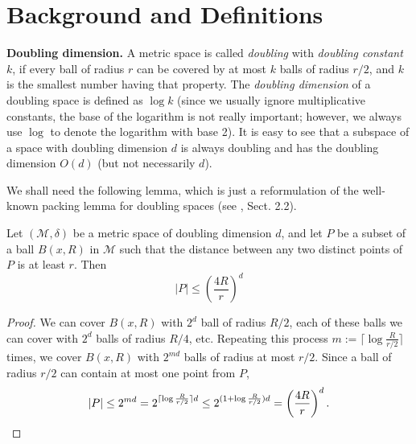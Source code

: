 \documentclass[a4paper,UKenglish,cleveref, autoref]{lipics-v2019}
\newcommand{\metricspace}{\mathcal{M}}
\newcommand{\dist}{\delta}
\newcommand{\myparagraph}[1]{\textbf{#1.}}
\begin{document}
\section{Background and Definitions}
%
\myparagraph{Doubling dimension}
A metric space is called \textit{doubling} with \textit{doubling constant} $k$,
if every ball of radius $r$ can be covered by at most $k$ balls of radius $r/2$,
and $k$ is the smallest number having that property.
The \textit{doubling dimension} of a doubling space is defined as $\log k$
(since we usually ignore multiplicative constants, the base of the logarithm is not really important; however,
we always use $\log$ to denote the logarithm with base 2).
It is easy to see that a subspace of a space with doubling dimension $d$ 
is always doubling and has the doubling dimension $O(d)$ (but not necessarily $d$).

We shall need the following lemma, which is just a reformulation of the well-known
packing lemma for doubling spaces (see \cite{smid_2009}, Sect. 2.2).

\begin{lemma}
\label{lem:packing_lemma}
 Let $(\metricspace,\dist)$ be a metric space of doubling dimension $d$, and let $P$ be a subset of a ball 
 $B(x,R)$ in $\metricspace$ such that the distance between any two distinct points of $P$ is at least $r$.
 Then 
 \[|P|\leq \left(\frac{4R}{r}\right)^{d}\]

\end{lemma}
\begin{proof}
We can cover $B(x,R)$ with $2^d$ ball of radius $R/2$, each of these balls we can cover with $2^d$
balls of radius $R/4$, etc. Repeating this process $m := \lceil \log \frac{R}{r/2} \rceil$ times, 
we cover
$B(x, R)$ with $2^{md}$ balls of radius at most $r/2$. Since a ball of radius $r/2$ can
contain at most one point from $P$, 
\[|P|\leq 2^{md}= 2^{\lceil \log \frac{R}{r/2} \rceil d}\leq 2^{(1 + \log \frac{R}{r/2})d}=\left(\frac{4R}{r}\right)^{d}.\qedhere\]
\end{proof}
\end{document}
